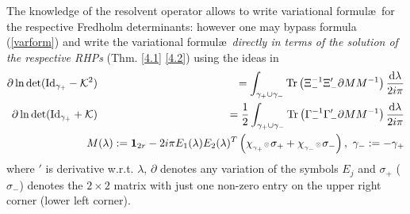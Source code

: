 \documentclass{article}
\def\ot{\hbox{\resizebox{6pt}{!}{$ \otimes \,
$}}}
\def\s{\sigma}
\def\&{&\hspace{-20pt}}
\def\d{{\rm d}}
\def\1{\mathbf 1}
\def \pa{\partial}
\def\Id{\mathrm{Id}}
\def\Tr{\mathop{{\rm Tr}}}
\newcommand{\be}{\begin{eqnarray}}
\newcommand{\ee}{\end{eqnarray}}
\def\le{\left}
\def\ri{\right}
\begin{document}
The knowledge of the resolvent operator allows to write variational formul\ae\ for the respective Fredholm determinants: however one may bypass formula (\ref{varform}) and write the variational formul\ae\ {\em directly in terms of the solution of the respective RHPs} (Thm. \ref{4.1} \ref{4.2}) using the ideas in \cite{BertolaIsoTau}
\be
\pa \ln \det (\Id_{\gamma_+} - \mathcal K^2) &\& = \int_{\gamma_+\cup \gamma_-} \Tr \le( \Xi_-^{-1} \Xi_-' \pa M M^{-1}
	\ri) \frac {\d\lambda}{2i\pi}  \\
 \pa \ln \det (\Id_{\gamma_+} + \mathcal K)
&\&  =\frac 1 2 \int_{\gamma_+\cup \gamma_-} \Tr \le( \Gamma_-^{-1} \Gamma_-' \pa M M^{-1}
	\ri) \frac {\d\lambda}{2i\pi}\\
&\&M(\lambda)  := \1_{2r} - 2i\pi E_1(\lambda) E_2(\lambda)^T \le(\chi_{_{\gamma_+}}\ot \s_++  \chi_{_{\gamma_-}}\ot \s_-\ri), \ \gamma_-:= -\gamma_+ 
\ee
where $\prime$ is derivative w.r.t. $\lambda$, $\pa$ denotes any variation of the symbols $E_j$ and $\sigma_+$ ($\sigma_-$) denotes the $2\times2$ matrix with just one non-zero entry on the upper right corner (lower left corner). 
\end{document}
